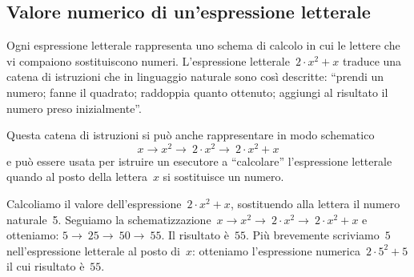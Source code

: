 \begin{comment}

\subsection{Lettere per esprimere proprietà}

Le proprietà delle operazioni tra numeri si esprimono con lettere per 
indicare che valgono per numeri qualsiasi.
La scrittura~``$(a+b)+c=a+(b+c)$'' per esempio esprime la proprietà 
associativa dell'addizione. In essa le lettere~$a$, $b$, $c$ indicano
numeri qualsiasi. I due schemi di calcolo ci dicono che per sommare tre 
numeri è indifferente aggiungere alla somma dei primi due il terzo oppure 
aggiungere al primo la somma degli altri due.


\end{comment}

\subsection{Valore numerico di un'espressione letterale}
\label{subsec:valnum}

Ogni espressione letterale rappresenta uno schema di calcolo in cui le 
lettere che vi compaiono sostituiscono numeri.
L'espressione letterale~$2\cdot x^{2}+x$ traduce una catena di istruzioni 
che in linguaggio naturale sono così descritte: ``prendi un numero; 
fanne il quadrato; raddoppia quanto ottenuto; aggiungi al risultato 
il numero preso inizialmente''.

Questa catena di istruzioni si può anche rappresentare in modo schematico
\[x\rightarrow x^{2}\rightarrow~2\cdot x^{2}\rightarrow~2\cdot x^{2}+x\]
e può essere usata per istruire un esecutore a ``calcolare'' l'espressione 
letterale quando al posto della lettera~$x$ si sostituisce un numero.

Calcoliamo il valore dell'espressione~$2\cdot x^{2}+x$, sostituendo alla 
lettera il numero naturale~5.
Seguiamo la schematizzazione~$x\rightarrow x^{2}\rightarrow~2\cdot 
x^{2}\rightarrow~2\cdot x^{2}+x$ e otteniamo:
$5\rightarrow~25\rightarrow~50\rightarrow~55$.
Il risultato è~$55$.
Più brevemente scriviamo~$5$ nell'espressione letterale al posto di~$x$: 
otteniamo l'espressione numerica~$2\cdot 5^{2}+5$ il cui risultato è~$55$.


